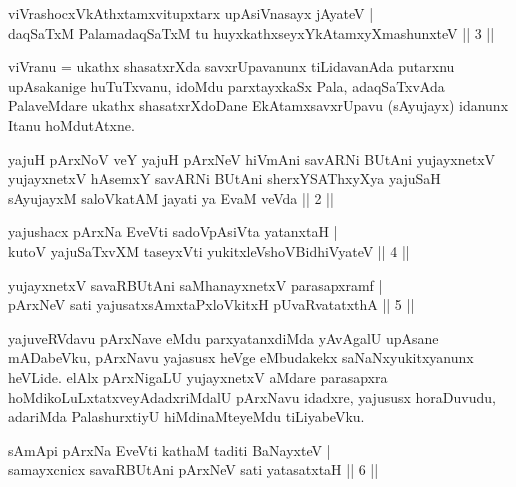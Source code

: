 \begin{shl}
viVrashocxVkAthxtamxvitupxtarx upAsiVnasayx jAyateV | \\
daqSaTxM PalamadaqSaTxM tu huyxkathxseyxYkAtamxyXmashunxteV \hfill ||  3 || 
\end{shl}

\begin{artha}
viVranu = ukathx shasatxrXda savxrUpavanunx tiLidavanAda putarxnu upAsakanige huTuTxvanu, idoMdu parxtayxkaSx Pala, adaqSaTxvAda PalaveMdare ukathx shasatxrXdoDane EkAtamxsavxrUpavu (sAyujayx) idanunx Itanu hoMdutAtxne.
\end{artha}

\begin{shl}
yajuH pArxNoV veY yajuH pArxNeV hiVmAni savARNi BUtAni yujayxnetxV yujayxnetxV hAsemxY savARNi BUtAni sherxYSAThxyXya yajuSaH sAyujayxM saloVkatAM jayati ya EvaM veVda || 2 ||
\end{shl}


\begin{shl}
yajushacx pArxNa EveVti sadoVpAsiVta yatanxtaH | \\
kutoV yajuSaTxvXM taseyxVti yukitxleVshoV\s BidhiVyateV \hfill ||  4 || 
\end{shl}

\begin{shl}
yujayxnetxV savaRBUtAni saMhanayxnetxV parasapxramf | \\
pArxNeV sati yajusatxsAmxtaPxloVkitxH pUvaRvatatxthA \hfill ||  5 || 
\end{shl}

\begin{artha}
yajuveRVdavu pArxNave eMdu parxyatanxdiMda yAvAgalU upAsane mADabeVku, pArxNavu yajasusx heVge eMbudakekx saNaNxyukitxyanunx heVLide. elAlx pArxNigaLU yujayxnetxV aMdare parasapxra hoMdikoLuLxtatxveyAdadxriMdalU pArxNavu idadxre, yajususx horaDuvudu, adariMda PalashurxtiyU hiMdinaMteyeMdu tiLiyabeVku.
\end{artha}

\begin{shl}
sAmApi pArxNa EveVti kathaM taditi BaNayxteV | \\
samayxcnicx savaRBUtAni pArxNeV sati yatasatxtaH \hfill ||  6 || 
\end{shl}

